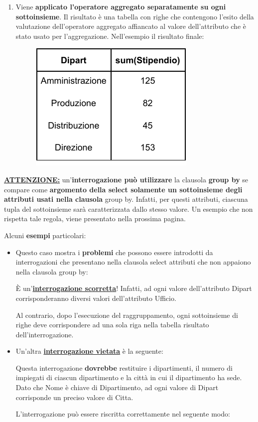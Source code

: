 \documentclass[a4paper]{article}
\begin{document}
\begin{enumerate}
		\item Viene \textbf{applicato l'operatore aggregato separatamente su ogni sottoinsieme}. Il risultato è una tabella con righe che contengono l'esito della valutazione dell'operatore aggregato affiancato al valore dell'attributo che è stato usato per l'aggregazione.\newline
		Nell'esempio il risultato finale:
		\begin{figure}[!htp]
			\centering
			\includegraphics[width=.4\textwidth]{img/group-by-ex3.pdf}
		\end{figure}
	\end{enumerate}
	\textbf{\underline{ATTENZIONE:}} un'\textbf{interrogazione può utilizzare} la clausola \textbf{\textsf{group by}} se compare come \textbf{argomento della \textsf{select} solamente un sottoinsieme degli attributi usati nella clausola} \textsf{group by}. Infatti, per questi attributi, ciascuna tupla del sottoinsieme sarà caratterizzata dallo stesso valore. Un esempio che non rispetta tale regola, viene presentato nella prossima pagina.\newpage
	
	\noindent
	Alcuni \textcolor{Green4}{\textbf{esempi}} particolari:
	\begin{itemize}
		\item Questo caso mostra i \textbf{problemi} che possono essere introdotti da interrogazioni che presentano nella clausola \textsf{select} attributi che non appaiono nella clausola \textsf{group by}:
		
		È un'\underline{\textbf{interrogazione scorretta}}! Infatti, ad ogni valore dell'attributo \textsf{Dipart} corrisponderanno diversi valori dell'attributo \textsf{Ufficio}.
		
		Al contrario, dopo l'esecuzione del raggruppamento, ogni sottoinsieme di righe deve corrispondere ad una sola riga nella tabella risultato dell'interrogazione.
		
		
		\item Un'altra \underline{\textbf{interrogazione vietata}} è la seguente:
		
		Questa interrogazione \textbf{dovrebbe} restituire i dipartimenti, il numero di impiegati di ciascun dipartimento e la città in cui il dipartimento ha sede. Dato che \textsf{Nome} è chiave di \textsf{Dipartimento}, ad ogni valore di \textsf{Dipart} corrisponde un preciso valore di \textsf{Citta}.
		
		L'interrogazione può essere riscritta correttamente nel seguente modo:
		
	\end{itemize}\newpage
\end{document}
